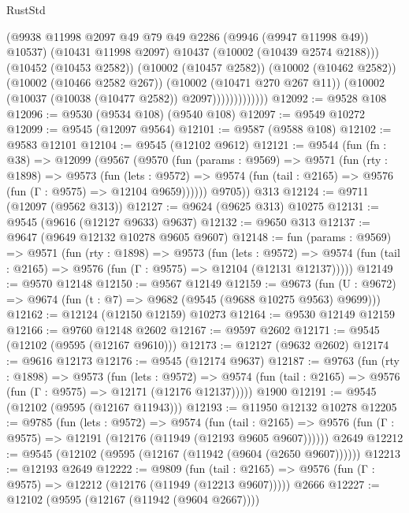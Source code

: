 \begin{lexlean}{RustStd}
\begin{coremodule}
                            (@9938 @11998 @2097 @49 @79 @49 @2286 (@9946 (@9947 @11998 @49)) @10537)
                            (@10431 @11998 @2097)
                            @10437
                            (@10002 (@10439 @2574 @2188)))
                          (@10452 (@10453 @2582))
                          (@10002 (@10457 @2582))
                          (@10002 (@10462 @2582))
                          (@10002 (@10466 @2582 @267))
                          (@10002 (@10471 @270 @267 @11))
                          (@10002 (@10037 (@10038 (@10477 @2582)) @2097)))))))))))))
@12092 := @9528 @108
@12096 := @9530 (@9534 @108) (@9540 @108)
@12097 := @9549 @10272
@12099 := @9545 (@12097 @9564)
@12101 := @9587 (@9588 @108)
@12102 := @9583 @12101
@12104 := @9545 (@12102 @9612)
@12121 := @9544
    (fun (fn : @38) =>
    @12099
      (@9567
        (@9570
          (fun (params : @9569) =>
          @9571
            (fun (rty : @1898) =>
            @9573
              (fun (lets : @9572) =>
              @9574 (fun (tail : @2165) => @9576 (fun (Γ : @9575) => @12104 @9659))))))
        @9705))
    @313
@12124 := @9711 (@12097 (@9562 @313))
@12127 := @9624 (@9625 @313) @10275
@12131 := @9545 (@9616 (@12127 @9633) @9637)
@12132 := @9650 @313
@12137 := @9647 (@9649 @12132 @10278 @9605 @9607)
@12148 := fun (params : @9569) =>
  @9571
    (fun (rty : @1898) =>
    @9573
      (fun (lets : @9572) =>
      @9574 (fun (tail : @2165) => @9576 (fun (Γ : @9575) => @12104 (@12131 @12137)))))
@12149 := @9570 @12148
@12150 := @9567 @12149
@12159 := @9673
    (fun (U : @9672) => @9674 (fun (t : @7) => @9682 (@9545 (@9688 @10275 @9563) @9699)))
@12162 := @12124 (@12150 @12159) @10273
@12164 := @9530 @12149 @12159
@12166 := @9760 @12148 @2602
@12167 := @9597 @2602
@12171 := @9545 (@12102 (@9595 (@12167 @9610)))
@12173 := @12127 (@9632 @2602)
@12174 := @9616 @12173
@12176 := @9545 (@12174 @9637)
@12187 := @9763
    (fun (rty : @1898) =>
    @9573
      (fun (lets : @9572) =>
      @9574 (fun (tail : @2165) => @9576 (fun (Γ : @9575) => @12171 (@12176 @12137)))))
    @1900
@12191 := @9545 (@12102 (@9595 (@12167 @11943)))
@12193 := @11950 @12132 @10278
@12205 := @9785
    (fun (lets : @9572) =>
    @9574
      (fun (tail : @2165) =>
      @9576 (fun (Γ : @9575) => @12191 (@12176 (@11949 (@12193 @9605 @9607))))))
    @2649
@12212 := @9545 (@12102 (@9595 (@12167 (@11942 (@9604 (@2650 @9607))))))
@12213 := @12193 @2649
@12222 := @9809
    (fun (tail : @2165) => @9576 (fun (Γ : @9575) => @12212 (@12176 (@11949 (@12213 @9607)))))
    @2666
@12227 := @12102 (@9595 (@12167 (@11942 (@9604 @2667))))

\end{coremodule}
\end{lexlean}
